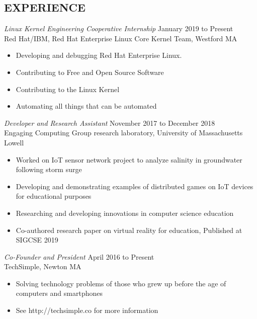 \documentclass[margin]{res}
\begin{document}
\begin{resume}
\section{EXPERIENCE} {\sl Linux Kernel Engineering Cooperative Internship} \hfill January 2019 to Present\\
                Red Hat/IBM, 
                Red Hat Enterprise Linux Core Kernel Team, Westford MA
                 \begin{itemize}  \itemsep -2pt %
                 \item Developing and debugging Red Hat Enterprise Linux. 
                \item   Contributing to Free and Open Source Software
                \item Contributing to the Linux Kernel
                \item Automating all things that can be automated
                \end{itemize}
 
                {\sl Developer and Research Assistant} \hfill            November 2017 to December 2018 \\
                Engaging Computing Group research laboratory, University of Massachusetts Lowell
                 \begin{itemize}  \itemsep -2pt %
                 \item Worked on IoT sensor network project to analyze salinity in groundwater following storm surge
                 \item Developing and demonstrating examples of distributed games on IoT devices for educational purposes
				  \item Researching and developing innovations in computer science education
				  \item Co-authored research paper on virtual reality for education, Published at SIGCSE 2019
                 \end{itemize} 
                {\sl Co-Founder and President} \hfill        April 2016 to Present \\
                TechSimple, Newton MA
                  \begin{itemize}   \itemsep -2pt %
                   \item Solving technology problems of those who grew up before the age of computers and smartphones
                   \item See http://techsimple.co for more information
                   \end{itemize} 


\end{resume}
\end{document}
